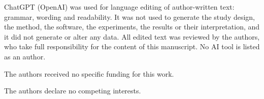 \documentclass[pdflatex,sn-nature,lineno]{sn-jnl}
\begin{document}
ChatGPT (OpenAI) was used for language editing of author-written text: grammar, wording
and readability. It was not used to generate the study design, the method, the software,
the experiments, the results or their interpretation, and it did not generate or alter any
data. All edited text was reviewed by the authors, who take full responsibility for the
content of this manuscript. No AI tool is listed as an author.

The authors received no specific funding for this work.

The authors declare no competing interests.


\end{document}
